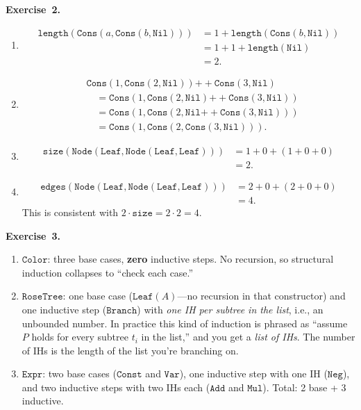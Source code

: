 \documentclass[11pt]{article}
\begin{document}
\medskip
\textbf{Exercise~2.}
\begin{enumerate}[label=(\alph*)]
  \item
  \begin{align*}
    \texttt{length}(\texttt{Cons}(a, \texttt{Cons}(b, \texttt{Nil})))
      &= 1 + \texttt{length}(\texttt{Cons}(b, \texttt{Nil})) \\
      &= 1 + 1 + \texttt{length}(\texttt{Nil}) \\
      &= 2.
  \end{align*}
  \item
  \begin{align*}
    &\texttt{Cons}(1, \texttt{Cons}(2, \texttt{Nil}))
      \mathbin{++} \texttt{Cons}(3, \texttt{Nil}) \\
    &\quad= \texttt{Cons}(1,
      \texttt{Cons}(2, \texttt{Nil}) \mathbin{++}
      \texttt{Cons}(3, \texttt{Nil})) \\
    &\quad= \texttt{Cons}(1,
      \texttt{Cons}(2, \texttt{Nil} \mathbin{++}
      \texttt{Cons}(3, \texttt{Nil}))) \\
    &\quad= \texttt{Cons}(1,
      \texttt{Cons}(2, \texttt{Cons}(3, \texttt{Nil}))).
  \end{align*}
  \item
  \begin{align*}
    \texttt{size}(\texttt{Node}(\texttt{Leaf},
      \texttt{Node}(\texttt{Leaf}, \texttt{Leaf})))
      &= 1 + 0 + (1 + 0 + 0) \\
      &= 2.
  \end{align*}
  \item
  \begin{align*}
    \texttt{edges}(\texttt{Node}(\texttt{Leaf},
      \texttt{Node}(\texttt{Leaf}, \texttt{Leaf})))
      &= 2 + 0 + (2 + 0 + 0) \\
      &= 4.
  \end{align*}
  This is consistent with $2 \cdot \texttt{size} = 2 \cdot 2 = 4$.
\end{enumerate}

\medskip
\textbf{Exercise~3.}
\begin{enumerate}[label=(\alph*)]
  \item $\texttt{Color}$: three base cases, \textbf{zero} inductive steps. No recursion, so structural induction collapses to ``check each case.''
  \item $\texttt{RoseTree}$: one base case ($\texttt{Leaf}(A)$---no recursion in that constructor) and one inductive step ($\texttt{Branch}$) with \emph{one IH per subtree in the list}, i.e., an unbounded number. In practice this kind of induction is phrased as ``assume $P$ holds for every subtree $t_i$ in the list,'' and you get a \emph{list of IHs}. The number of IHs is the length of the list you're branching on.
  \item $\texttt{Expr}$: two base cases ($\texttt{Const}$ and $\texttt{Var}$), one inductive step with one IH ($\texttt{Neg}$), and two inductive steps with two IHs each ($\texttt{Add}$ and $\texttt{Mul}$). Total: 2 base + 3 inductive.
\end{enumerate}
\end{document}
